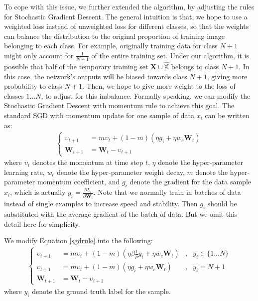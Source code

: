 To cope with this issue, we further extended the algorithm, by adjusting the rules for Stochastic Gradient Descent. The general intuition is that, we hope to use a weighted loss instead of unweighted loss for different classes, so that the weights can balance the distribution to the original proportion of training image belonging to each class. For example, originally training data for class $N+1$ might only account for $\frac{1}{N+1}$ of the entire training set. Under our algorithm, it is possible that half of the temporary training set $\mathbf{X} \cup \hat{\mathbb{X}}$ belongs to class $N+1$. In this case, the network's outputs will be biased towards class $N+1$, giving more probability to class $N+1$. Then, we hope to give more weight to the loss of classes $1...N$, to adjust for this imbalance. Formally speaking, we can modify the Stochastic Gradient Descent with momentum rule to achieve this goal. The standard SGD with momentum update for one sample of data $x_i$ can be written as:
\begin{align}
\left\{
\begin{aligned}
	\upsilon_{t+1} &= m\upsilon_t + (1-m)\left( \eta g_i + \eta w_c \mathbf{W}_t \right)\\
	\mathbf{W}_{t+1} &= \mathbf{W}_{t} - \upsilon_{t+1}
\end{aligned}
\right.
\label{sgdrule}
\end{align}
where $\upsilon_t$ denotes the momentum at time step $t$, $\eta$ denote the hyper-parameter learning rate, $w_c$ denote the hyper-parameter weight decay, $m$ denote the hyper-parameter momentum coefficient, and $g_i$ denote the gradient for the data sample $x_i$, which is actually $g_i = \frac{\partial L_i}{\partial \mathbf{W}_t}$. Note that we normally train in batches of data instead of single examples to increase speed and stability. Then $g_i$ should be substituted with the average gradient of the batch of data. But we omit this detail here for simplicity.

We modify Equation \ref{sgdrule} into the following:
\begin{align}
\left\{
\begin{aligned}
\upsilon_{t+1} &= m\upsilon_t + (1-m)\left( \eta\beta\frac{1}{p} g_i + \eta w_c \mathbf{W}_t \right)&, &   y_i \in \{1...N\}\\
\upsilon_{t+1} &= m\upsilon_t + (1-m)\left( \eta g_i + \eta w_c \mathbf{W}_t \right)&, &   y_i = N+1\\
\mathbf{W}_{t+1} &= \mathbf{W}_{t} - \upsilon_{t+1}
\end{aligned}
\right.
\label{sgdrule2}
\end{align}
where $y_i$ denote the ground truth label for the sample.

